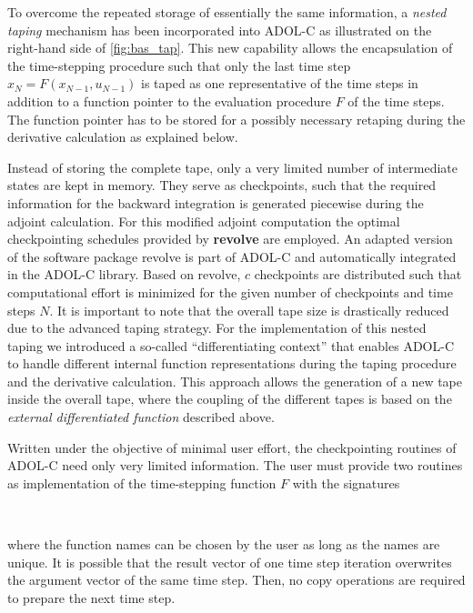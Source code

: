 \documentclass[11pt,twoside]{article}
\begin{document}
To overcome the repeated storage of essentially the same information, 
a {\em nested taping} mechanism has been incorporated into ADOL-C as illustrated on
the right-hand side of \autoref{fig:bas_tap}. This new
capability allows the encapsulation of the time-stepping procedure
such that only the last time step $x_{N} = F(x_{N-1},u_{N-1})$ is taped as one
representative of the time steps in addition to a function pointer to the 
evaluation procedure $F$ of the time steps.  The function pointer has
to be stored for a possibly necessary retaping during the derivative calculation
as explained below. 

Instead of storing the complete tape, only a very limited number of intermediate
states are kept in memory. They serve as checkpoints, such that
the required information for the backward integration is generated
piecewise during the adjoint calculation.
For this modified adjoint computation the optimal checkpointing schedules
provided by {\bf revolve} are employed. An adapted version of the
software package {\sf revolve} is part of ADOL-C and automatically
integrated in the ADOL-C library. Based on {\sf revolve}, $c$ checkpoints are
distributed such that computational effort is minimized for the given
number of checkpoints and time steps $N$. It is important to note that the overall tape
size is drastically reduced due to the advanced taping strategy.  For the
implementation of this nested taping we introduced 
a so-called ``differentiating context'' that enables \mbox{ADOL-C} to
handle different internal function representations during the taping 
procedure and the derivative calculation. This approach allows the generation of a new
tape inside the overall tape, where the coupling of the different tapes is based on
the {\em external differentiated function} described above.

Written under the objective of minimal user effort, the checkpointing routines
of \mbox{ADOL-C} need only very limited information. The user must
provide two routines as implementation of the time-stepping function $F$ 
with the signatures
\medskip

\noindent
\hspace*{2cm}{\sf int timeStepFunction(size\_t n, adouble *state);}\\
\hspace*{2cm}{\sf int timeStepFunction(size\_t n, double *state);}
\medskip

\noindent
where the function names can be chosen by the user as long as the names are
unique. It is possible that the result vector of one time step
iteration overwrites the argument vector of the same time step. Then, no
copy operations are required to prepare the next time step.
\end{document}

